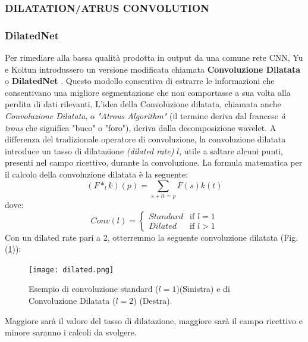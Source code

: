 \subsubsection{DILATATION/ATRUS CONVOLUTION}
\subsubsection{DilatedNet}
Per rimediare alla bassa qualità prodotta in output da una comune rete CNN, Yu 
e Koltun introdussero un versione modificata chiamata {\bfseries{Convoluzione Dilatata}} 
o {\bfseries{DilatedNet}} \cite{DilatedNet}. Questo modello consentiva di estrarre le informazioni che 
consentivano una migliore segmentazione che non comportasse a sua volta alla 
perdita di dati rilevanti. L’idea della Convoluzione dilatata, chiamata anche 
\emph{Convoluzione Dilatata}, o \emph{"Atrous Algorithm"} (il termine deriva dal francese \emph{à trous} che significa "buco" o "foro"),  deriva dalla decomposizione wavelet. A differenza del 
tradizionale operatore di convoluzione, la convoluzione dilatata introduce un tasso 
di dilatazione \emph{(dilated rate)} $l$, utile a saltare alcuni punti, presenti nel 
campo ricettivo, durante la convoluzione. La formula matematica per il calcolo della 
convoluzione dilatata è la seguente:
\begin{equation}
    (F*_lk)(p) = \sum_{s+lt=p}F(s)k(t)
\end{equation}
dove:
\begin{equation}\label{dilated rate}
    Conv(l) = \left\{
        \begin{array}{rl}
        Standard & \mbox{if } l = 1\\
        Dilated & \mbox{if } l > 1
        \end{array}
        \right.
\end{equation}
Con un dilated rate pari a 2, otterremmo la seguente convoluzione dilatata (Fig. (\ref{dilated})):
\begin{figure}
    \centering
    \texttt{[image: dilated.png]}
    \centering
    \caption{Esempio di convoluzione standard ($l=1$)(Sinistra) e di Convoluzione Dilatata ($l=2$) (Destra).}
    \label{dilated}
\end{figure}
Maggiore sarà il valore del tasso di dilatazione, maggiore sarà il campo ricettivo 
e minore saranno i calcoli da svolgere. 

